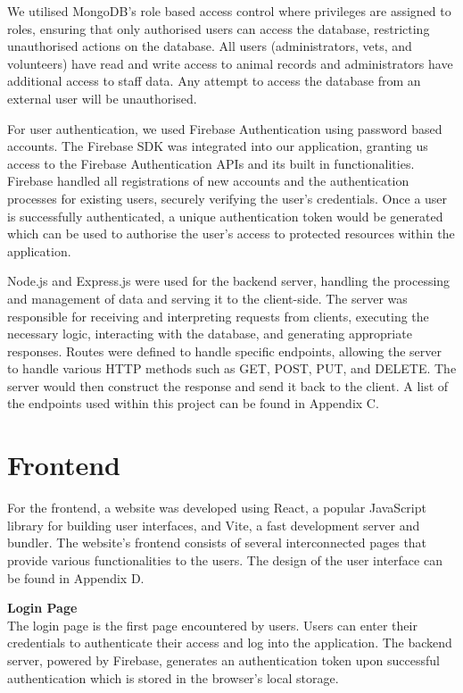 We utilised MongoDB’s role based access control where privileges are assigned to roles, ensuring that only authorised users can access the database, restricting unauthorised actions on the database. All users (administrators, vets, and volunteers) have read and write access to animal records and administrators have additional access to staff data. Any attempt to access the database from an external user will be unauthorised.

For user authentication, we used Firebase Authentication using password based accounts. The Firebase SDK was integrated into our application, granting us access to the Firebase Authentication APIs and its built in functionalities. Firebase handled all registrations of new accounts and the authentication processes for existing users, securely verifying the user’s credentials. Once a user is successfully authenticated, a unique authentication token would be generated which can be used to authorise the user’s access to protected resources within the application.

Node.js and Express.js were used for the backend server, handling the processing and management of data and serving it to the client-side. The server was responsible for receiving and interpreting requests from clients, executing the necessary logic, interacting with the database, and generating appropriate responses. Routes were defined to handle specific endpoints, allowing the server to handle various HTTP methods such as GET, POST, PUT, and DELETE. The server would then construct the response and send it back to the client. A list of the endpoints used within this project can be found in Appendix C.


\section{Frontend}
For the frontend, a website was developed using React, a popular JavaScript library for building user interfaces, and Vite, a fast development server and bundler. The website’s frontend consists of several interconnected pages that provide various functionalities to the users. The design of the user interface can be found in Appendix D.

\textbf{Login Page}\\
The login page is the first page encountered by users. Users can enter their credentials to authenticate their access and log into the application. The backend server, powered by Firebase, generates an authentication token upon successful authentication which is stored in the browser's local storage.

